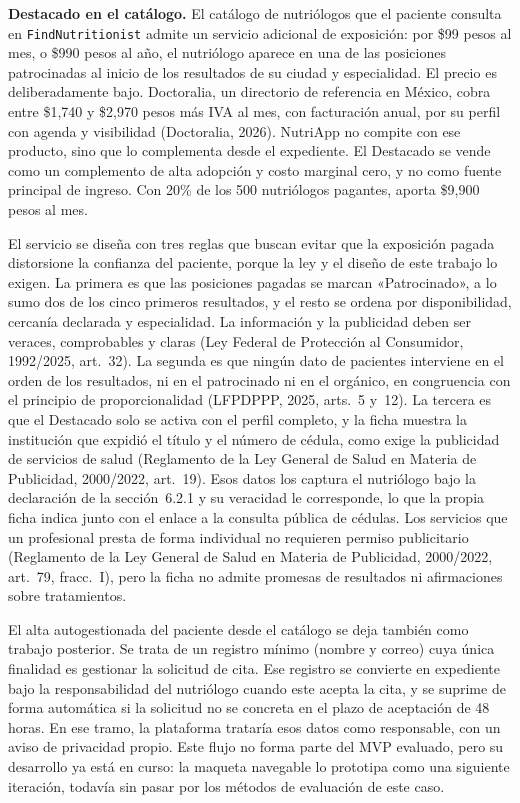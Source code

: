 \documentclass[12pt, a4paper]{article}
\begin{document}
\textbf{Destacado en el catálogo.} El catálogo de nutriólogos que el
paciente consulta en \texttt{FindNutritionist} admite un servicio
adicional de exposición: por \$99 pesos al mes, o \$990 pesos al año, el
nutriólogo aparece en una de las posiciones patrocinadas al inicio de
los resultados de su ciudad y especialidad. El precio es deliberadamente
bajo. Doctoralia, un directorio de referencia en México, cobra entre
\$1,740 y \$2,970 pesos más IVA al mes, con facturación anual, por su
perfil con agenda y visibilidad (Doctoralia, 2026). NutriApp no compite
con ese producto, sino que lo complementa desde el expediente. El
Destacado se vende como un complemento de alta adopción y costo marginal
cero, y no como fuente principal de ingreso. Con 20\% de los 500
nutriólogos pagantes, aporta \$9,900 pesos al mes.

El servicio se diseña con tres reglas que buscan evitar que la
exposición pagada distorsione la confianza del paciente, porque la ley y
el diseño de este trabajo lo exigen. La primera es que las posiciones
pagadas se marcan «Patrocinado», a lo sumo dos de los cinco primeros
resultados, y el resto se ordena por disponibilidad, cercanía declarada
y especialidad. La información y la publicidad deben ser veraces,
comprobables y claras (Ley Federal de Protección al Consumidor,
1992/2025, art.~32). La segunda es que ningún dato de pacientes
interviene en el orden de los resultados, ni en el patrocinado ni en el
orgánico, en congruencia con el principio de proporcionalidad (LFPDPPP,
2025, arts.~5 y~12). La tercera es que el Destacado solo se activa con
el perfil completo, y la ficha muestra la institución que expidió el
título y el número de cédula, como exige la publicidad de servicios de
salud (Reglamento de la Ley General de Salud en Materia de Publicidad,
2000/2022, art.~19). Esos datos los captura el nutriólogo bajo la
declaración de la sección~6.2.1 y su veracidad le corresponde, lo que la
propia ficha indica junto con el enlace a la consulta pública de
cédulas. Los servicios que un profesional presta de forma individual no
requieren permiso publicitario (Reglamento de la Ley General de Salud en
Materia de Publicidad, 2000/2022, art.~79, fracc.~I), pero la ficha no
admite promesas de resultados ni afirmaciones sobre tratamientos.

El alta autogestionada del paciente desde el catálogo se deja también
como trabajo posterior. Se trata de un registro mínimo (nombre y correo)
cuya única finalidad es gestionar la solicitud de cita. Ese registro se
convierte en expediente bajo la responsabilidad del nutriólogo cuando
este acepta la cita, y se suprime de forma automática si la solicitud no
se concreta en el plazo de aceptación de 48 horas. En ese tramo, la
plataforma trataría esos datos como responsable, con un aviso de
privacidad propio. Este flujo no forma parte del MVP evaluado, pero su
desarrollo ya está en curso: la maqueta navegable lo prototipa como una
siguiente iteración, todavía sin pasar por los métodos de evaluación de
este caso.
\end{document}
